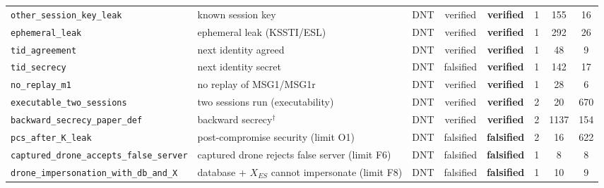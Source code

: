 \begin{table}[!t]
\begin{tabular}{p{3.9cm}p{4.0cm}cccccc}
\texttt{other\_\allowbreak{}session\_\allowbreak{}key\_\allowbreak{}leak} & known session key & DNT & verified & \textbf{verified} & 1 & 155 & 16 \\
\texttt{ephemeral\_\allowbreak{}leak} & ephemeral leak (KSSTI/ESL) & DNT & verified & \textbf{verified} & 1 & 292 & 26 \\
\texttt{tid\_\allowbreak{}agreement} & next identity agreed & DNT & verified & \textbf{verified} & 1 & 48 & 9 \\
\texttt{tid\_\allowbreak{}secrecy} & next identity secret & DNT & falsified & \textbf{verified} & 1 & 142 & 17 \\
\texttt{no\_\allowbreak{}replay\_\allowbreak{}m1} & no replay of MSG1/MSG1r & DNT & verified & \textbf{verified} & 1 & 28 & 6 \\
\texttt{executable\_\allowbreak{}two\_\allowbreak{}sessions} & two sessions run (executability) & DNT & verified & \textbf{verified} & 2 & 20 & 670 \\
\texttt{backward\_\allowbreak{}secrecy\_\allowbreak{}paper\_\allowbreak{}def} & backward secrecy$^\dagger$ & DNT & verified & \textbf{verified} & 2 & 1137 & 154 \\
\texttt{pcs\_\allowbreak{}after\_\allowbreak{}K\_\allowbreak{}leak} & post-compromise security (limit O1) & DNT & falsified & \textbf{falsified} & 2 & 16 & 622 \\
\texttt{captured\_\allowbreak{}drone\_\allowbreak{}accepts\_\allowbreak{}false\_\allowbreak{}server} & captured drone rejects false server (limit F6) & DNT & falsified & \textbf{falsified} & 1 & 8 & 8 \\
\texttt{drone\_\allowbreak{}impersonation\_\allowbreak{}with\_\allowbreak{}db\_\allowbreak{}and\_\allowbreak{}X} & database + $X_{ES}$ cannot impersonate (limit F8) & DNT & falsified & \textbf{falsified} & 1 & 10 & 9 \\
\bottomrule
\end{tabular}
\end{table}
